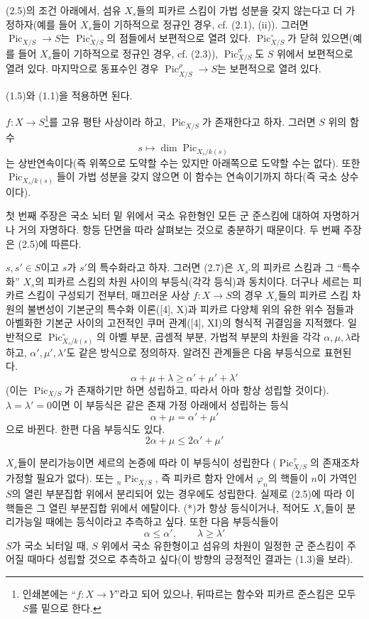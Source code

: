  (2.5)의 조건 아래에서, 섬유 $X_s$들의 피카르 스킴이
가법 성분을 갖지 않는다고 더 가정하자(예를 들어 $X_s$들이 기하적으로
정규인 경우, cf. (2.1), (ii)). 그러면
$\operatorname{Pic}_{X/S}\longrightarrow S$는
$\operatorname{Pic}_{X/S}^\circ$의 점들에서 보편적으로 열려 있다.
$\operatorname{Pic}_{X/S}^\circ$가 닫혀 있으면(예를 들어 $X_s$들이
기하적으로 정규인 경우, cf. (2.3)),
$\operatorname{Pic}_{X/S}^\sigma$도 $S$ 위에서 보편적으로 열려 있다.
마지막으로 동표수인 경우
$\operatorname{Pic}_{X/S}^\rho\longrightarrow S$는 보편적으로 열려 있다.

(1.5)와 (1.1)을 적용하면 된다.

 $f:X\longrightarrow S$\footnote{인쇄본에는
``$f:X\longrightarrow Y$''라고 되어 있으나, 뒤따르는 함수와 피카르
준스킴은 모두 $S$를 밑으로 한다.}를 고유 평탄 사상이라 하고,
$\operatorname{Pic}_{X/S}$가 존재한다고 하자. 그러면 $S$ 위의 함수
\[
s\longmapsto\dim\operatorname{Pic}_{X_s/k(s)}
\]
는 상반연속이다(즉 위쪽으로 도약할 수는 있지만 아래쪽으로 도약할 수는 없다).
또한 $\operatorname{Pic}_{X_s/k(s)}$들이 가법 성분을 갖지 않으면 이 함수는
연속이기까지 하다(즉 국소 상수이다).

첫 번째 주장은 국소 뇌터 밑 위에서 국소 유한형인 모든 군 준스킴에 대하여
자명하거나 거의 자명하다. 항등 단면을 따라 살펴보는 것으로 충분하기
때문이다. 두 번째 주장은 (2.5)에 따른다.

 $s,s'\in S$이고 $s$가 $s'$의 특수화라고 하자. 그러면
(2.7)은 $X_{s'}$의 피카르 스킴과 그 ``특수화'' $X_s$의 피카르 스킴의
차원 사이의 부등식(각각 등식)과 동치이다. 더구나 세르는 피카르 스킴이
구성되기 전부터, 매끄러운 사상 $f:X\longrightarrow S$의 경우 $X_s$들의
피카르 스킴 차원의 불변성이 기본군의 특수화 이론([4], X)과 피카르 다양체
위의 유한 위수 점들과 아벨화한 기본군 사이의 고전적인 쿠머 관계([4], XI)의
형식적 귀결임을 지적했다. 일반적으로
$\operatorname{Pic}_{X_s/k(s)}^\circ$의 아벨 부분, 곱셈적 부분, 가법적
부분의 차원을 각각 $\alpha,\mu,\lambda$라 하고,
$\alpha',\mu',\lambda'$도 같은 방식으로 정의하자. 알려진 관계들은 다음
부등식으로 표현된다.
\[
\tag{*}\alpha+\mu+\lambda\geq\alpha'+\mu'+\lambda'
\]
(이는 $\operatorname{Pic}_{X/S}$가 존재하기만 하면 성립하고, 따라서 아마
항상 성립할 것이다). $\lambda=\lambda'=0$이면 이 부등식은 같은 존재 가정
아래에서 성립하는 등식
\[
\alpha+\mu=\alpha'+\mu'
\]
으로 바뀐다. 한편 다음 부등식도 있다.
\[
\tag{**}2\alpha+\mu\leq2\alpha'+\mu'
\]

$X_s$들이 분리가능이면 세르의 논증에 따라 이 부등식이 성립한다
($\operatorname{Pic}_{X/S}^\tau$의 존재조차 가정할 필요가 없다). 또는
${}_n\operatorname{Pic}_{X/S}$, 즉 피카르 함자 안에서 $\varphi_n$의 핵들이
$n$이 가역인 $S$의 열린 부분집합 위에서 분리되어 있는 경우에도 성립한다.
실제로 (2.5)에 따라 이 핵들은 그 열린 부분집합 위에서 에탈이다. (*)가 항상
등식이거나, 적어도 $X_s$들이 분리가능일 때에는 등식이라고 추측하고 싶다.
또한 다음 부등식들이
\[
\tag{***}\alpha\leq\alpha',\qquad\lambda\geq\lambda'
\]
$S$가 국소 뇌터일 때, $S$ 위에서 국소 유한형이고 섬유의 차원이 일정한 군
준스킴이 주어질 때마다 성립할 것으로 추측하고 싶다(이 방향의 긍정적인
결과는 (1.3)을 보라).

